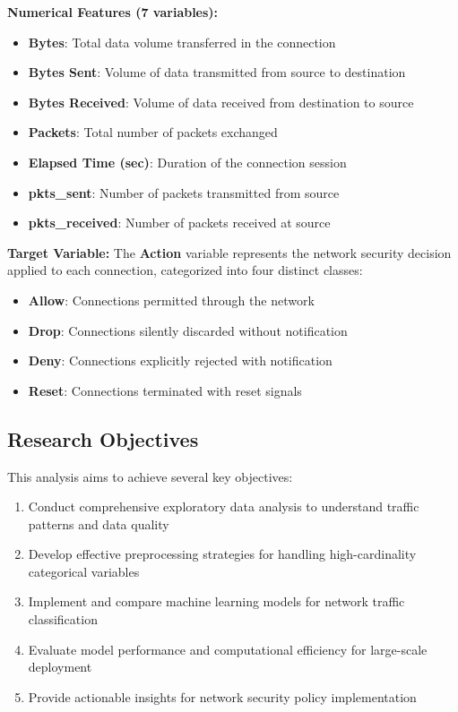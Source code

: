 \documentclass[12pt,a4paper]{article}
\begin{document}
\textbf{Numerical Features (7 variables):}
\begin{itemize}
    \item \textbf{Bytes}: Total data volume transferred in the connection
    \item \textbf{Bytes Sent}: Volume of data transmitted from source to destination
    \item \textbf{Bytes Received}: Volume of data received from destination to source
    \item \textbf{Packets}: Total number of packets exchanged
    \item \textbf{Elapsed Time (sec)}: Duration of the connection session
    \item \textbf{pkts\_sent}: Number of packets transmitted from source
    \item \textbf{pkts\_received}: Number of packets received at source
\end{itemize}

\textbf{Target Variable:}
The \textbf{Action} variable represents the network security decision applied to each connection, categorized into four distinct classes:
\begin{itemize}
    \item \textbf{Allow}: Connections permitted through the network
    \item \textbf{Drop}: Connections silently discarded without notification
    \item \textbf{Deny}: Connections explicitly rejected with notification
    \item \textbf{Reset}: Connections terminated with reset signals
\end{itemize}

\subsection{Research Objectives}

This analysis aims to achieve several key objectives:

\begin{enumerate}
    \item Conduct comprehensive exploratory data analysis to understand traffic patterns and data quality
    \item Develop effective preprocessing strategies for handling high-cardinality categorical variables
    \item Implement and compare machine learning models for network traffic classification
    \item Evaluate model performance and computational efficiency for large-scale deployment
    \item Provide actionable insights for network security policy implementation
\end{enumerate}
\end{document}
